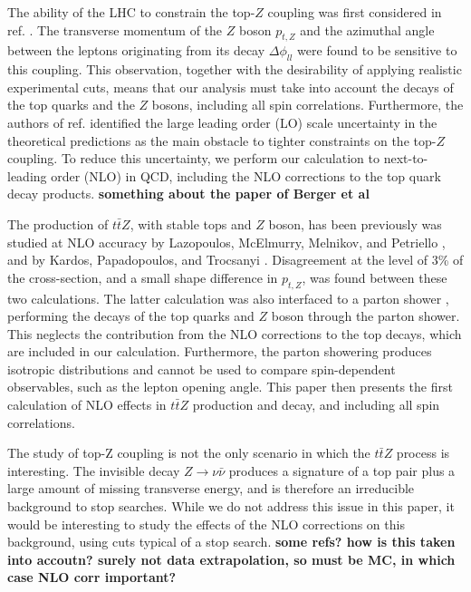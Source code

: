 \documentclass[preprint]{JHEP3} %
\def\Dphill{\Delta \phi_{ll}}
\def\ttbZ{t\bar{t}Z}
\def\ptZ{p_{t,Z}}
\begin{document}
The ability of the LHC to constrain the top-$Z$ coupling was first considered in ref. \cite{Baur:2004uw,Baur:2005wi}. The transverse momentum of the $Z$ boson $\ptZ$ and the azimuthal angle between the leptons originating from its decay $\Dphill$ were found to be sensitive to this coupling. This observation, together with the desirability of applying realistic experimental cuts, means that our analysis must take into account the decays of the top quarks and the $Z$ bosons, including all spin correlations. Furthermore, the authors of ref. \cite{Baur:2004uw,Baur:2005wi} identified the large leading order (LO) scale uncertainty in the theoretical predictions as the main obstacle to tighter constraints on the top-$Z$ coupling. To reduce this uncertainty, we perform our calculation to next-to-leading order (NLO) in QCD, including the NLO corrections to the top quark decay products. {\bf something about the paper of Berger et al}

The production of $\ttbZ$, with stable tops and $Z$ boson, has been previously was studied at NLO accuracy by Lazopoulos, McElmurry, Melnikov, and Petriello \cite{Lazopoulos:2008de}, and  by Kardos, Papadopoulos, and Trocsanyi \cite{Kardos:2011na}. Disagreement at the level of 3\% of the cross-section, and a small shape difference in $\ptZ$, was found between these two calculations. The latter calculation was also interfaced to a parton shower \cite{Garzelli:2011is}, performing the decays of the top quarks and $Z$ boson through the parton shower. This neglects the contribution from the NLO corrections to the top decays, which are included in our calculation. Furthermore, the parton showering produces isotropic distributions and cannot be used to compare spin-dependent observables, such as the lepton opening angle.  This paper then presents the first calculation of NLO effects in $\ttbZ$ production and decay, and including all spin correlations.

The study of top-Z coupling is not the only scenario in which the $\ttbZ$ process is interesting. The invisible decay $Z \to \nu \bar{\nu}$ produces a signature of a top pair plus a large amount of missing transverse energy, and is therefore an irreducible background to stop searches. While we do not address this issue in this paper, it would be interesting to study the effects of the NLO corrections on this background, using cuts typical of a stop search. {\bf some refs? how is this taken into accoutn? surely not data extrapolation, so must be MC, in which case NLO corr important?}
\end{document}
